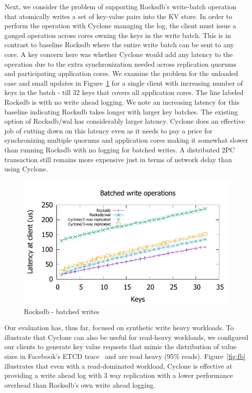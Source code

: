\documentclass[pageno]{jpaper}
\begin{document}
Next, we consider the problem of supporting Rocksdb's write-batch operation that
atomically writes a set of key-value pairs into the KV store. In order to
perform the operation with Cyclone managing the log, the client must issue a
ganged operation across cores owning the keys in the write batch. This is in
contrast to baseline Rocksdb where the entire write batch can be sent to any
core. A key concern here was whether Cyclone would add any latency to the
operation due to the extra synchronization needed across replication quorums and
participating application cores. We examine the problem for the unloaded case
and small updates in Figure~\ref{fig:rocksdb_multi} for a single client with
increasing number of keys in the batch - till 32 keys that covers all
application cores. The line labeled Rocksdb is with no write ahead logging. We
note an increasing latency for this baseline indicating Rocksdb takes longer
with larger key batches. The existing option of Rocksdb/wal has considerably
larger latency. Cyclone does an effective job of cutting down on this latency
even as it needs to pay a price for synchronizing multiple quorums and
application cores making it somewhat slower than running Rocksdb with no logging
for batched writes. A distributed 2PC transaction still remains more expensive
just in terms of network delay than using Cyclone.

\begin{figure}
\includegraphics[scale=0.6]{results2/rocksdb_multi.pdf}
\caption{Rocksdb - batched writes}
\label{fig:rocksdb_multi}
\end{figure}

Our evaluation has, thus far, focused on synthetic write heavy
workloads. To illustrate that Cyclone can also be useful for read-heavy
workloads, we configured our clients to generate key value requests that mimic
the distribution of value sizes in Facebook's ETCD
trace~\cite{fb_workload_analysis,fb_scaling_memcache} and are read
heavy (95\% reads). Figure~\ref{fig:fb} illustrates that even with a
read-dominated workload, Cyclone is effective at providing a write ahead log
with 3 way replication with a lower performance overhead than Rocksdb's own
write ahead logging.
\end{document}
